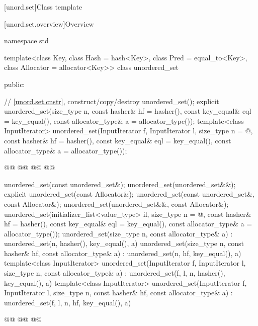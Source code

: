 \documentclass{wg21}
\begin{document}
[unord.set]{Class template }%

[unord.set.overview]{Overview}

%
\begin{codeblock}
namespace std {
template<class Key,
class Hash = hash<Key>,
class Pred = equal_to<Key>,
class Allocator = allocator<Key>>
class unordered_set {
    public:
    
    // \ref{unord.set.cnstr}, construct/copy/destroy
    unordered_set();
    explicit unordered_set(size_type n,
    const hasher& hf = hasher(),
    const key_equal& eql = key_equal(),
    const allocator_type& a = allocator_type());
    template<class InputIterator>
    unordered_set(InputIterator f, InputIterator l,
        size_type n = @\seebelow@,
        const hasher& hf = hasher(),
        const key_equal& eql = key_equal(),
        const allocator_type& a = allocator_type());
    
    @@
    @@
    @@
    @@
    
    unordered_set(const unordered_set&);
    unordered_set(unordered_set&&);
    explicit unordered_set(const Allocator&);
    unordered_set(const unordered_set&, const Allocator&);
    unordered_set(unordered_set&&, const Allocator&);
    unordered_set(initializer_list<value_type> il,
        size_type n = @\seebelow@,
        const hasher& hf = hasher(),
        const key_equal& eql = key_equal(),
        const allocator_type& a = allocator_type());
    unordered_set(size_type n, const allocator_type& a)
    : unordered_set(n, hasher(), key_equal(), a) { }
    unordered_set(size_type n, const hasher& hf, const allocator_type& a)
    : unordered_set(n, hf, key_equal(), a) { }
    template<class InputIterator>
    unordered_set(InputIterator f, InputIterator l, size_type n, const allocator_type& a)
    : unordered_set(f, l, n, hasher(), key_equal(), a) { }
    template<class InputIterator>
    unordered_set(InputIterator f, InputIterator l, size_type n, const hasher& hf,
        const allocator_type& a)
    : unordered_set(f, l, n, hf, key_equal(), a) { }
    
    @@
    @@
    @@
    
}}
\end{codeblock}
\end{document}
